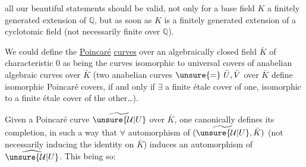 all our beautiful statements should be valid, not only for a base field $K$ a finitely generated extension of $\mathbb{Q}$, but as soon as $K$ is a finitely generated extension of a cyclotomic field (not necessarily finite over $\mathbb{Q}$).

We could define the \uline{Poincaré} \uline{curves} over an algebraically closed field $\bar K$ of characteristic $0$ as being the curves isomorphic to universal covers of anabelian algebraic curves over $\bar K$ (two anabelian curves $\unsure{=}\ \bar U,\bar V$ over $\bar K$ define isomorphic Poincaré covers, if and only if $\exists$ a finite étale cover of one, isomorphic to a finite étale cover of the other\ldots).

Given a Poincaré curve $\widetilde{\unsure{\mathcal U|U}}$ over $\bar K$,  one canonically defines its completion, in such a way that $\forall$ automorphism of $(\widetilde{\unsure{\mathcal U|U}},\bar K)$ (not necessarily inducing the identity on $\bar K$) induces an automorphism of $\widehat{\unsure{\mathcal U|U}}$.
This being so:
